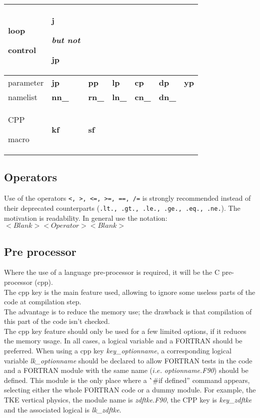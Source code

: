 \documentclass{article}
\begin{document}
\begin{table}[htbp]
\begin{center}
\begin{tabular}{|p{50pt}|p{50pt}|p{50pt}|p{50pt}|p{50pt}|p{50pt}|p{50pt}|}
      \hline
      loop \par control& \textbf{j} \par \textit{but not } \par \textbf{jp}& & & & &  \\
      \hline
      parameter& \textbf{jp}& \textbf{pp}& \textbf{lp}& \textbf{cp}& \textbf{dp}& \textbf{yp} \\
      \hline
      namelist& \textbf{nn\_}& \textbf{rn\_}& \textbf{ln\_}& \textbf{cn\_}& \textbf{dn\_}& \\
      \hline
      CPP \par macro& \textbf{kf}& \textbf{sf} \par & & & & \\
      \hline
    \end{tabular}
    \label{tab1}
  \end{center}
\end{table}

\subsection{Operators}

Use of the operators \texttt{<, >, <=, >=, ==, /=} is strongly recommended instead of their deprecated counterparts
(\texttt{.lt., .gt., .le., .ge., .eq., .ne.}).
The motivation is readability.
In general use the notation: \\
$<Blank><Operator><Blank>$
\subsection{Pre processor}

Where the use of a language pre-processor is required, it will be the C pre-processor (cpp). \\
The cpp key is the main feature used, allowing to ignore some useless parts of the code at compilation step. \\
The advantage is to reduce the memory use; the drawback is that compilation of this part of the code isn't checked. \\
The cpp key feature should only be used for a few limited options, if it reduces the memory usage.
In all cases, a logical variable and a FORTRAN  should be preferred.
When using a cpp key \textit{key\_optionname},
a corresponding logical variable \textit{lk\_optionname} should be declared to
allow FORTRAN  tests in the code and
a FORTRAN module with the same name ($i.e.$ \textit{optionname.F90}) should be defined.
This module is the only place where a \``\#if defined'' command appears, selecting either the whole FORTRAN code or
a dummy module.
For example, the TKE vertical physics, the module name is \textit{zdftke.F90},
the CPP key is \textit{key\_zdftke} and the associated logical is \textit{lk\_zdftke}.
\end{document}
